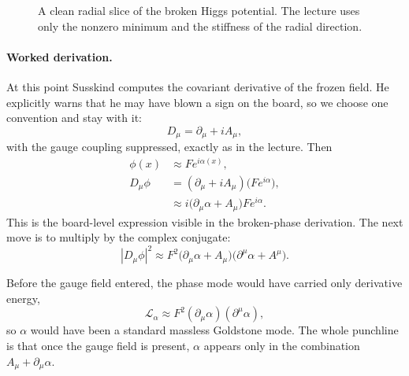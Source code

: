 \begin{figure}[t]
\centering
{}
\caption{A clean radial slice of the broken Higgs potential. The lecture uses only the nonzero minimum and the stiffness of the radial direction.}
\end{figure}

\paragraph{Worked derivation.}
At this point Susskind computes the covariant derivative of the frozen field. He explicitly warns that he may have blown a sign on the board, so we choose one convention and stay with it:
\begin{equation}
D_\mu=\partial_\mu+iA_\mu,
\end{equation}
with the gauge coupling suppressed, exactly as in the lecture. Then
\begin{align}
\phi(x)&\approx F e^{i\alpha(x)},\\
D_\mu\phi
&=(\partial_\mu+iA_\mu)\bigl(F e^{i\alpha}\bigr),\\
&\approx i\bigl(\partial_\mu\alpha+A_\mu\bigr)F e^{i\alpha}.
\end{align}
This is the board-level expression visible in the broken-phase derivation. The next move is to multiply by the complex conjugate:
\begin{equation}
|D_\mu\phi|^2 \approx F^2\bigl(\partial_\mu\alpha+A_\mu\bigr)\bigl(\partial^\mu\alpha+A^\mu\bigr).
\end{equation}

Before the gauge field entered, the phase mode would have carried only derivative energy,
\begin{equation}
\mathcal{L}_\alpha \approx F^2(\partial_\mu\alpha)(\partial^\mu\alpha),
\end{equation}
so \(\alpha\) would have been a standard massless Goldstone mode. The whole punchline is that once the gauge field is present, \(\alpha\) appears only in the combination \(A_\mu+\partial_\mu\alpha\).

